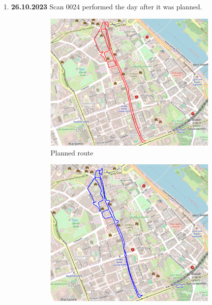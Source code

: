 \documentclass[a4paper,12pt]{book}
\begin{document}
\begin{enumerate}
	\item \textbf{26.10.2023} Scan 0024 performed the day after it was planned.
	\begin{figure}[H]
		\centering
		\begin{subfigure}{.80\textwidth}
			\centering
			\includegraphics[width=1\linewidth]{route_p24}
			\caption{Planned route}
			\label{fig:a24}
		\end{subfigure}%
		\linebreak
		\begin{subfigure}{.80\textwidth}
			\centering
			\includegraphics[width=1\linewidth]{route_c24}

\end{subfigure}
\end{figure}
\end{enumerate}
\end{document}
